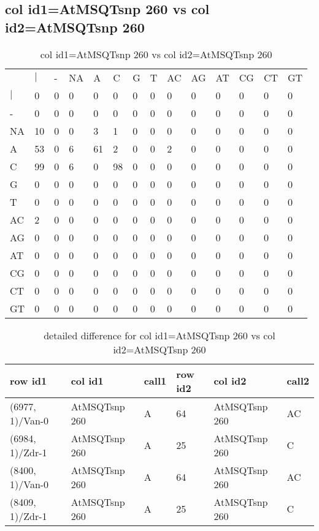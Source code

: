 \subsection{col id1=AtMSQTsnp 260 vs col id2=AtMSQTsnp 260}
\begin{center}
\begin{longtable}{|l|l|l|l|l|l|l|l|l|l|l|l|l|l|}
\caption{col id1=AtMSQTsnp 260 vs col id2=AtMSQTsnp 260} \label{table_dm806}\\
\hline
\\
\hline
&$|$&-&NA&A&C&G&T&AC&AG&AT&CG&CT&GT\\
$|$&0&0&0&0&0&0&0&0&0&0&0&0&0\\
-&0&0&0&0&0&0&0&0&0&0&0&0&0\\
NA&10&0&0&3&1&0&0&0&0&0&0&0&0\\
A&53&0&6&61&2&0&0&2&0&0&0&0&0\\
C&99&0&6&0&98&0&0&0&0&0&0&0&0\\
G&0&0&0&0&0&0&0&0&0&0&0&0&0\\
T&0&0&0&0&0&0&0&0&0&0&0&0&0\\
AC&2&0&0&0&0&0&0&0&0&0&0&0&0\\
AG&0&0&0&0&0&0&0&0&0&0&0&0&0\\
AT&0&0&0&0&0&0&0&0&0&0&0&0&0\\
CG&0&0&0&0&0&0&0&0&0&0&0&0&0\\
CT&0&0&0&0&0&0&0&0&0&0&0&0&0\\
GT&0&0&0&0&0&0&0&0&0&0&0&0&0\\
\hline
\end{longtable}
\end{center}

\begin{center}
\begin{longtable}{|l|l|l|l|l|l|}
\caption{detailed difference for col id1=AtMSQTsnp 260 vs col id2=AtMSQTsnp 260} \label{table_dm807}\\
\hline
row id1&col id1&call1&row id2&col id2&call2\\
\hline
(6977, 1)/Van-0&AtMSQTsnp 260&A&64&AtMSQTsnp 260&AC\\
(6984, 1)/Zdr-1&AtMSQTsnp 260&A&25&AtMSQTsnp 260&C\\
(8400, 1)/Van-0&AtMSQTsnp 260&A&64&AtMSQTsnp 260&AC\\
(8409, 1)/Zdr-1&AtMSQTsnp 260&A&25&AtMSQTsnp 260&C\\
\hline
\end{longtable}
\end{center}

